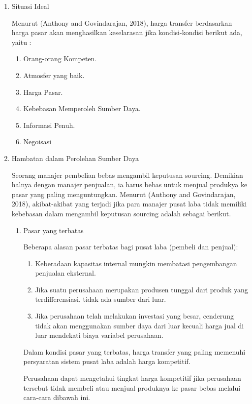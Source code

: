 \begin{enumerate}
	\item Situasi Ideal
	
	Menurut (Anthony and Govindarajan, 2018), harga transfer berdasarkan harga pasar akan menghasilkan keselarasan jika kondisi-kondisi berikut ada, yaitu :

	\begin{enumerate}
		\item Orang-orang Kompeten.
		\item Atmosfer yang baik.
		\item Harga Pasar.
		\item Kebebasan Memperoleh Sumber Daya.
		\item Informasi Penuh.
		\item Negoisasi
	\end{enumerate}

	\item Hambatan dalam Perolehan Sumber Daya
	
	Seorang manajer pembelian bebas mengambil keputusan sourcing. Demikian halnya dengan manajer penjualan, ia harus bebas untuk menjual produkya ke pasar yang paling menguntungkan. Menurut (Anthony and Govindarajan, 2018), akibat-akibat yang terjadi jika para manajer pusat laba tidak memiliki kebebasan dalam mengambil keputusan sourcing adalah sebagai berikut.

	\begin{enumerate}
		\item Pasar yang terbatas
		
		Beberapa alasan pasar terbatas bagi pusat laba (pembeli dan penjual):

		\begin{enumerate}
			\item Keberadaan kapasitas internal mungkin membatasi pengembangan penjualan eksternal.
			\item Jika suatu perusahaan merupakan produsen tunggal dari produk yang terdifferensiasi, tidak ada sumber dari luar.
			\item Jika perusahaan telah melakukan investasi yang besar, cenderung tidak akan menggunakan sumber daya dari luar kecuali harga jual di luar mendekati biaya variabel perusahaan.
		\end{enumerate}

		Dalam kondisi pasar yang terbatas, harga transfer yang paling memenuhi persyaratan sistem pusat laba adalah harga kompetitif.

		Perusahaan dapat mengetahui tingkat harga kompetitif jika perusahaan tersebut tidak membeli atau menjual produknya ke pasar bebas melalui cara-cara dibawah ini.


\end{enumerate}
\end{enumerate}
